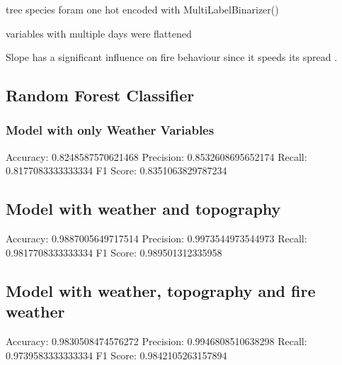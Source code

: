 tree species foram one hot encoded with MultiLabelBinarizer()

variables with multiple days were flattened

Slope has a significant influence on fire behaviour since it speeds its spread \cite{Marques2011}.


\subsection{Random Forest Classifier}



\subsubsection{Model with only Weather Variables}

Accuracy: 0.8248587570621468
Precision: 0.8532608695652174
Recall: 0.8177083333333334
F1 Score: 0.8351063829787234


\subsection{Model with weather and topography}

Accuracy: 0.9887005649717514
Precision: 0.9973544973544973
Recall: 0.9817708333333334
F1 Score: 0.989501312335958

\subsection{Model with weather, topography and fire weather}

Accuracy: 0.9830508474576272
Precision: 0.9946808510638298
Recall: 0.9739583333333334
F1 Score: 0.9842105263157894






